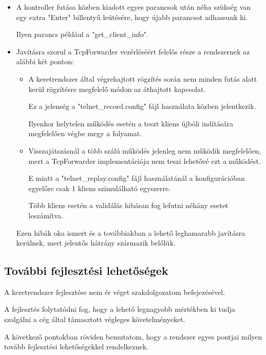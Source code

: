 \documentclass[a4paper,12pt,oneside]{report}
\begin{document}
\begin{itemize}
    \itemsep0em
        \item A kontroller futása közben kiadott egyes parancsok után néha szükség van egy extra "Enter" billentyű leütésére, hogy újabb parancsot adhassunk ki.

        Ilyen parancs például a "get\_client\_info".
        \item Javításra szorul a TcpForwarder vezérléséért felelős része a rendszernek az alábbi két ponton:
        \begin{itemize}
        \itemsep0em
        \item A keretrendszer által végrehajtott rögzítés során nem minden futás alatt kerül rögzítésre megfelelő módon az áthajtott kapcsolat.
        
        Ez a jelenség a "telnet\_record.config" fájl használata közben jelentkezik.
        
        Ilyenkor helytelen működés esetén a teszt kliens újbóli indítására megfelelően végbe megy a folyamat.
        \item Visszajátszásnál a több szálú működés jelenleg nem működik megfelelően, mert a TcpForwarder implementációja nem teszi lehetővé ezt a működést.

        E miatt a "telnet\_replay.config" fájl használatánál a konfigurációban egyelőre csak 1 kliens szimulálható egyszerre.
        
        Több kliens esetén a validálás hibásan fog lefutni néhány esetet leszámítva.
        \end{itemize}
        
        Ezen hibák oka ismert és a továbbiakban a lehető leghamarabb javításra kerülnek, mert jelentős hátrány származik belőlük.
\end{itemize}

\subsection{További fejlesztési lehetőségek}

A keretrendszer fejlesztése nem ér véget szakdolgozatom befejezésével.

A fejlesztés folytatódni fog, hogy a lehető legnagyobb mértékben ki tudja szolgálni a cég által támasztott végleges követelményeket.

A következő pontokban röviden bemutatom, hogy a rendszer egyes pontjai milyen tovább fejlesztési lehetőségekkel rendelkeznek.
\end{document}
